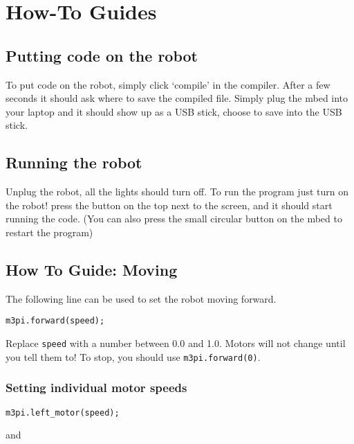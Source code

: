\section{How-To Guides}\label{how-to-guides}

\subsection{Putting code on the robot}\label{putting-code-on-the-robot}

To put code on the robot, simply click `compile' in the compiler. After
a few seconds it should ask where to save the compiled file. Simply plug
the mbed into your laptop and it should show up as a USB stick, choose
to save into the USB stick.

\subsection{Running the robot}\label{running-the-robot}

Unplug the robot, all the lights should turn off. To run the program
just turn on the robot! press the button on the top next to the screen,
and it should start running the code. (You can also press the small
circular button on the mbed to restart the program)

\subsection{How To Guide: Moving}\label{how-to-guide-moving}

The following line can be used to set the robot moving forward.

\begin{lstlisting}
m3pi.forward(speed);
\end{lstlisting}

Replace \lstinline!speed! with a number between 0.0 and 1.0. Motors will
not change until you tell them to! To stop, you should use
\lstinline!m3pi.forward(0)!.

\subsubsection{Setting individual motor
speeds}\label{setting-individual-motor-speeds}

\begin{lstlisting}
m3pi.left_motor(speed);
\end{lstlisting}

and

